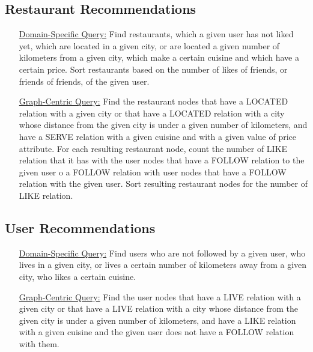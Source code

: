 \subsection{Restaurant Recommendations}
\begin{itemize}
    \item [\underline{Domain-Specific Query:}] Find restaurants, which a given
	    user has not liked yet, which are located in a given city, or are
	    located a given number of kilometers from a given city, which make a
	    certain cuisine and which have a certain price. Sort restaurants
	    based on the number of likes of friends, or friends of friends, of
	    the given user.
    \item [\underline{Graph-Centric Query:}] Find the restaurant nodes that have
	    a LOCATED relation with a given city or that have a LOCATED relation
	    with a city whose distance from the given city is under a given
	    number of kilometers, and have a SERVE relation with a given cuisine
	    and with a given value of price attribute. For each resulting
	    restaurant node, count the number of LIKE relation that it has with
	    the user nodes that have a FOLLOW relation to the given user o a
	    FOLLOW relation with user nodes that have a FOLLOW relation with the
	    given user. Sort resulting restaurant nodes for the number of LIKE
	    relation.  
\end{itemize}
    
\subsection{User Recommendations}
\begin{itemize}
    \item [\underline{Domain-Specific Query:}] Find users who are not followed
	    by a given user, who lives in a given city, or lives a certain
	    number of kilometers away from a given city, who likes a certain
	    cuisine.
    \item [\underline{Graph-Centric Query:}] Find the user nodes that have a
	    LIVE relation with a given city or that have a LIVE relation with a
	    city whose distance from the given city is under a given number of
	    kilometers, and have a LIKE relation with a given cuisine and the
	    given user does not have a FOLLOW relation with them.
\end{itemize}
    
